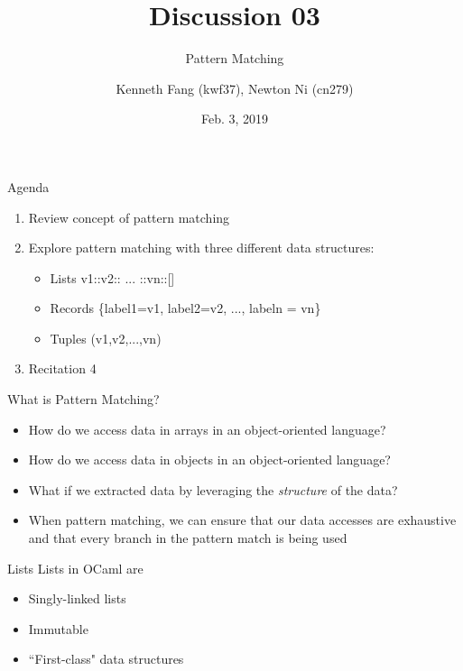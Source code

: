 \documentclass{beamer}
\title{Discussion 03}
\subtitle{Pattern Matching}
\author{Kenneth Fang (kwf37), Newton Ni (cn279)}
\date{Feb. 3, 2019}
\begin{document}
    \begin{frame}
        \titlepage{}
    \end{frame}
    
    \begin{frame}{Agenda}
    \begin{enumerate}
        \item Review concept of pattern matching
        
        \item Explore pattern matching with three different data structures:
            \begin{itemize}
                \item Lists v1::v2:: ... ::vn::[]
                \item Records \{label1=v1, label2=v2, ..., labeln = vn\}
                \item Tuples (v1,v2,...,vn)
            \end{itemize}
        
        \item Recitation 4
    \end{enumerate}
    \end{frame}
    
    \begin{frame}{What is Pattern Matching?}
    \pause
    \begin{itemize}
        \item How do we access data in arrays in an object-oriented language? \pause
        \item How do we access data in objects in an object-oriented language? \pause
        \item What if we extracted data by leveraging the \textit{structure} of the data? \pause
        \item When pattern matching, we can ensure that our data accesses are exhaustive and that every branch in the pattern match is being used
    \end{itemize}
    \end{frame}
    
    \begin{frame}{Lists}
        Lists in OCaml are
        \begin{itemize}
            \item Singly-linked lists
            \item Immutable
            \item ``First-class" data structures
        \end{itemize}
    \end{frame}
    
\end{document}
